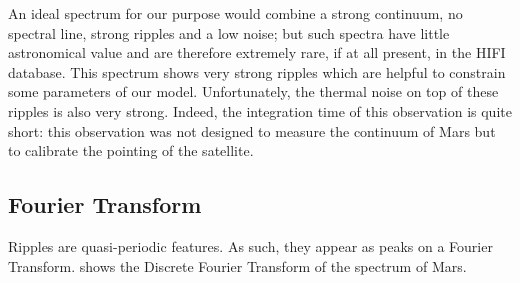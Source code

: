 \begin{refsection}
An ideal spectrum for our purpose would combine a strong continuum, no spectral line, strong ripples and a low noise; but such spectra have little astronomical value and are therefore extremely rare, if at all present, in the HIFI database.
This spectrum shows very strong ripples which are helpful to constrain some parameters of our model.
Unfortunately, the thermal noise on top of these ripples is also very strong.
Indeed, the integration time of this observation is quite short: this observation was not designed to measure the continuum of Mars but to calibrate the pointing of the satellite.





\subsection{Fourier Transform}
Ripples are quasi-periodic features.
As such, they appear as peaks on a Fourier Transform.
 shows the Discrete Fourier Transform of the spectrum of Mars.


\end{refsection}
